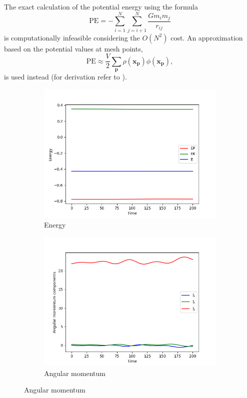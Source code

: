 The exact calculation of the potential energy \cite{taylor2005classical} using the formula
\begin{equation*}
    \textrm{PE} = -\sum_{i=1}^{N}\sum_{j=i+1}^{N}\frac{G m_i m_j}{r_{ij}}
\end{equation*}
is computationally infeasible considering the $O(N^2)$ cost.
An approximation based on the potential values at mesh points,
\begin{equation*}
    \textrm{PE} \approx \frac{V}{2}\sum_{\mathbf{p}} \rho(\mathbf{x}_\mathbf{p})\phi(\mathbf{x}_\mathbf{p}),
\end{equation*}
is used instead (for derivation refer to \cite{Hockney1988}).
\begin{figure}[htp]
    \centering
    \begin{subfigure}[b]{0.45\textwidth}
        \centering
        \includegraphics[width=\textwidth]{img/pm/energy.png}
        \caption{Energy}
        \label{fig:physical-quantities-pm-sub1}
    \end{subfigure}
    \hfill
    \begin{subfigure}[b]{0.45\textwidth}
        \centering
        \includegraphics[width=\textwidth]{img/pm/angular-momentum.png}
        \caption{Angular momentum}
        \label{fig:physical-quantities-pm-sub2}
    \end{subfigure}


\end{figure}

